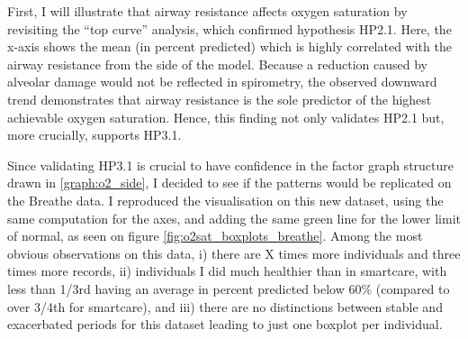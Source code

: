 First, I will illustrate that airway resistance affects oxygen saturation by revisiting the “top curve” analysis, which confirmed hypothesis HP2.1. Here, the x-axis shows the mean \F (in percent predicted) which is highly correlated with the airway resistance from the \F side of the model. Because a reduction caused by alveolar damage would not be reflected in spirometry, the observed downward trend demonstrates that airway resistance is the sole predictor of the highest achievable oxygen saturation. Hence, this finding not only validates HP2.1 but, more crucially, supports HP3.1.

Since validating HP3.1 is crucial to have confidence in the factor graph structure drawn in \ref{graph:o2_side}, I decided to see if the patterns would be replicated on the Breathe data. I reproduced the visualisation on this new dataset, using the same computation for the axes, and adding the same green line for the lower limit of normal, as seen on figure \ref{fig:o2sat_boxplots_breathe}. Among the most obvious observations on this data, i) there are X times more individuals and three times more records,  ii) individuals I did much healthier than in smartcare, with less than 1/3rd having an average \F in percent predicted below 60\% (compared to over 3/4th for smartcare), and iii) there are no distinctions between stable and exacerbated periods for this dataset leading to just one boxplot per individual. 

